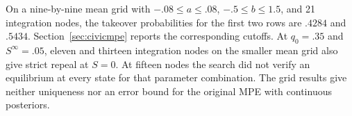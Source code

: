 \documentclass[11pt,letterpaper]{article}
\begin{document}
On a nine-by-nine mean grid with $-.08\le a\le .08$, $-.5\le b\le1.5$, and 21 integration nodes, the takeover probabilities for the first two rows are $.4284$ and $.5434$. Section~\ref{sec:civicmpe} reports the corresponding cutoffs. At $q_0=.35$ and $S^\infty=.05$, eleven and thirteen integration nodes on the smaller mean grid also give strict repeal at $S=0$. At fifteen nodes the search did not verify an equilibrium at every state for that parameter combination. The grid results give neither uniqueness nor an error bound for the original MPE with continuous posteriors.
\end{document}
